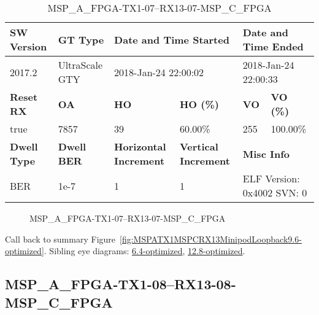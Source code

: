 \begin{table}[h]
\centering
\caption{MSP\_A\_FPGA-TX1-07--RX13-07-MSP\_C\_FPGA}
\label{tab:MSPAFPGATX107RX1307MSPCFPGA9.6-optimized}
\begin{tabular}{@{}|l|l|l|l|l|l|@{}}
\toprule
\textbf{SW Version}                & \textbf{GT Type}   & \multicolumn{2}{l|}{\textbf{Date and Time Started}}            & \multicolumn{2}{l|}{\textbf{Date and Time Ended}}        \\ \midrule
2017.2                       & UltraScale GTY          & \multicolumn{2}{l|}{2018-Jan-24 22:00:02}                   & \multicolumn{2}{l|}{2018-Jan-24 22:00:33}               \\ \midrule
\textbf{Reset RX}                  & \textbf{OA} & \textbf{HO}   & \textbf{HO (\%)} & \textbf{VO} & \textbf{VO (\%)} \\ \midrule
true & 7857        & 39          & 60.00\%        & 255        & 100.00\%       \\ \midrule
\textbf{Dwell Type}                & \textbf{Dwell BER} & \textbf{Horizontal Increment} & \textbf{Vertical Increment}    & \multicolumn{2}{l|}{\textbf{Misc Info}}                  \\ \midrule
BER                            & 1e-7        & 1        & 1           & \multicolumn{2}{l|}{ELF Version: 0x4002 SVN: 0}                         \\ \bottomrule
\end{tabular}
\end{table}

\begin{figure}[h]
\caption{MSP\_A\_FPGA-TX1-07--RX13-07-MSP\_C\_FPGA} \label{fig:MSPAFPGATX107RX1307MSPCFPGA9.6-optimized}
\end{figure}

Call back to summary Figure~\ref{fig:MSPATX1MSPCRX13MinipodLoopback9.6-optimized}.
Sibling eye diagrams: \hyperref[sec:MSPAFPGATX107RX1307MSPCFPGA6.4-optimized]{6.4-optimized}, \hyperref[sec:MSPAFPGATX107RX1307MSPCFPGA12.8-optimized]{12.8-optimized}.

\clearpage
\newpage


\subsection{MSP\_A\_FPGA-TX1-08--RX13-08-MSP\_C\_FPGA}\label{sec:MSPAFPGATX108RX1308MSPCFPGA9.6-optimized}

